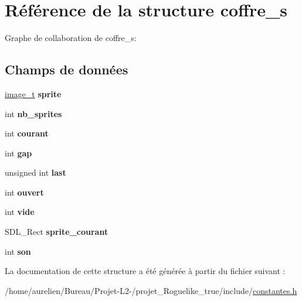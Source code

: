 \hypertarget{structcoffre__s}{}\section{Référence de la structure coffre\+\_\+s}
\label{structcoffre__s}


Graphe de collaboration de coffre\+\_\+s\+:
\subsection*{Champs de données}
\begin{DoxyCompactItemize}
\item 
\mbox{\label{structcoffre__s_a1e372820bc9a93d20c2715b5bcefe59b}} 
\hyperlink{structimage__t}{image\+\_\+t} {\bfseries sprite}
\item 
\mbox{\label{structcoffre__s_acb74780068d09b6da099afcaaa67ac05}} 
int {\bfseries nb\+\_\+sprites}
\item 
\mbox{\label{structcoffre__s_a58c81297e1a3ff9b8c57af130d328f37}} 
int {\bfseries courant}
\item 
\mbox{\label{structcoffre__s_aa79f5ce2035c5bf41c27624cf9d8e5cd}} 
int {\bfseries gap}
\item 
\mbox{\label{structcoffre__s_aae82fd10c563234f599064033332c2de}} 
unsigned int {\bfseries last}
\item 
\mbox{\label{structcoffre__s_a8361237c4a774197591e88296a85c3a2}} 
int {\bfseries ouvert}
\item 
\mbox{\label{structcoffre__s_a77f6dc9609e90e32af6665ef58b2d52e}} 
int {\bfseries vide}
\item 
\mbox{\label{structcoffre__s_ab00a24cd489be5da50d65395bde2e254}} 
S\+D\+L\+\_\+\+Rect {\bfseries sprite\+\_\+courant}
\item 
\mbox{\label{structcoffre__s_aa144b47814d09d8ce3276a2169ba77ed}} 
int {\bfseries son}
\end{DoxyCompactItemize}


La documentation de cette structure a été générée à partir du fichier suivant \+:\begin{DoxyCompactItemize}
\item 
/home/aurelien/\+Bureau/\+Projet-\/\+L2-\//projet\+\_\+\+Roguelike\+\_\+true/include/\hyperlink{constantes_8h}{constantes.\+h}\end{DoxyCompactItemize}
